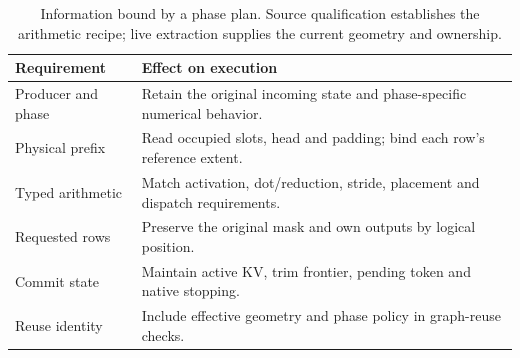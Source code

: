 \begin{table}[t]
\centering\footnotesize\tighttable
\caption{Information bound by a phase plan. Source qualification establishes the arithmetic recipe; live extraction supplies the current geometry and ownership.}
\label{tab:requirements}
\begin{tabularx}{\columnwidth}{@{}L{1.70cm}Y@{}}\toprule
Requirement & Effect on execution\\\midrule
Producer and phase & Retain the original incoming state and phase-specific numerical behavior.\\
Physical prefix & Read occupied slots, head and padding; bind each row's reference extent.\\
Typed arithmetic & Match activation, dot/reduction, stride, placement and dispatch requirements.\\
Requested rows & Preserve the original mask and own outputs by logical position.\\
Commit state & Maintain active KV, trim frontier, pending token and native stopping.\\
Reuse identity & Include effective geometry and phase policy in graph-reuse checks.\\\bottomrule
\end{tabularx}
\end{table}
